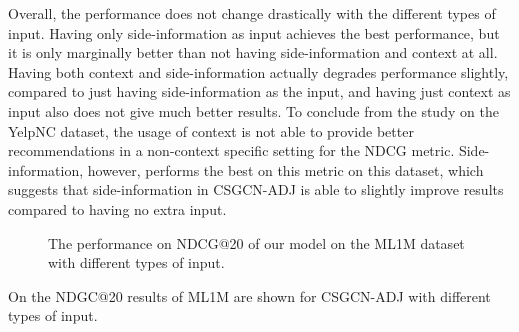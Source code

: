 Overall, the performance does not change drastically with the different types of input.
Having only side-information as input achieves the best performance, but it is only marginally better than not having side-information and context at all.
Having both context and side-information actually degrades performance slightly, compared to just having side-information as the input, and having just context as input also does not give much better results.
To conclude from the study on the YelpNC dataset, the usage of context is not able to provide better recommendations in a non-context specific setting for the NDCG metric.
Side-information, however, performs the best on this metric on this dataset, which suggests that side-information in CSGCN-ADJ is able to slightly improve results compared to having no extra input.

\begin{figure}
    \caption{The performance on NDCG@20 of our model on the ML1M dataset with different types of input.}
    \label{fig:ablation_study_2}
\end{figure}
On  the NDGC@20 results of ML1M are shown for CSGCN-ADJ with different types of input. 
